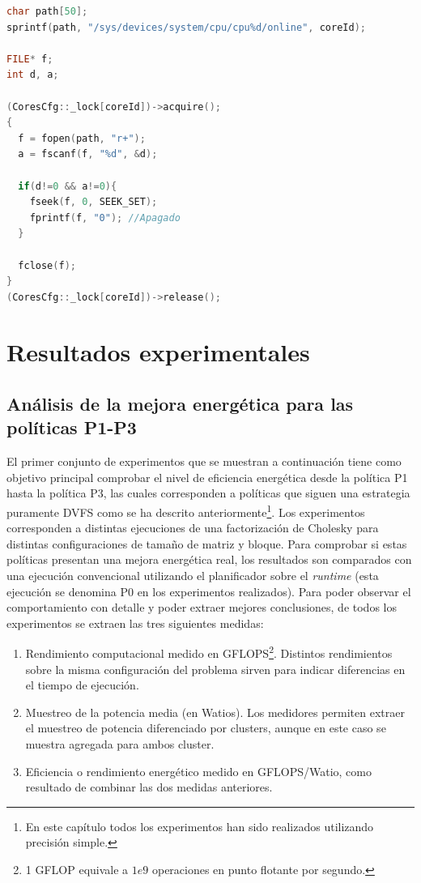 \begin{lstlisting}[float,language=C++,caption={Fragmento de código para el apagado de cores de manera
    dinámica.},label={fig:lst:apagado-cores}]
char path[50];
sprintf(path, "/sys/devices/system/cpu/cpu%d/online", coreId);

FILE* f;
int d, a;

(CoresCfg::_lock[coreId])->acquire();
{
  f = fopen(path, "r+");
  a = fscanf(f, "%d", &d);
	
  if(d!=0 && a!=0){
    fseek(f, 0, SEEK_SET);
    fprintf(f, "0"); //Apagado
  }
	
  fclose(f);
}
(CoresCfg::_lock[coreId])->release();
\end{lstlisting}




\section{Resultados experimentales}

\subsection{Análisis de la mejora energética para las políticas P1-P3}

El primer conjunto de experimentos que se muestran a continuación tiene
como objetivo principal comprobar el nivel de eficiencia energética desde
la política P1 hasta la política P3, las cuales corresponden a políticas
que siguen una estrategia puramente DVFS como se ha descrito
anteriormente\footnote{En este capítulo todos los experimentos han sido
  realizados utilizando precisión simple.}. Los experimentos corresponden a
distintas ejecuciones de una factorización de Cholesky para distintas
configuraciones de tamaño de matriz y bloque. Para comprobar si estas
políticas presentan una mejora energética real, los resultados son
comparados con una ejecución convencional utilizando el planificador \botlev sobre
el \emph{runtime} \ompss (esta ejecución se denomina P0 en los experimentos
realizados). Para poder observar el comportamiento con detalle y poder
extraer mejores conclusiones, de todos los experimentos se extraen las tres
siguientes medidas:
\begin{enumerate}
\item Rendimiento computacional medido en GFLOPS\footnote{1 GFLOP equivale a $1e9$ operaciones en 
		punto flotante por segundo.}. Distintos rendimientos
  sobre la misma configuración del problema sirven para indicar
  diferencias en el tiempo de ejecución.

\item Muestreo de la potencia media (en Watios). Los medidores
  permiten extraer el muestreo de potencia diferenciado por clusters, aunque
		en este caso se muestra agregada para ambos cluster.

\item Eficiencia o rendimiento energético medido en GFLOPS/Watio, como resultado de
  combinar las dos medidas anteriores.
\end{enumerate}

